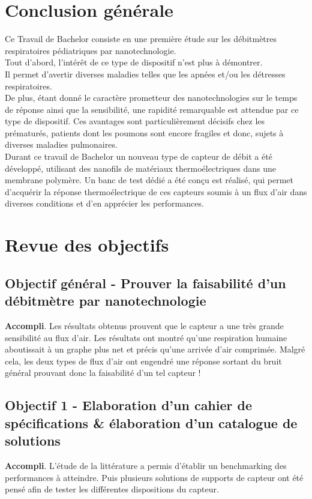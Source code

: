 \section{Conclusion générale}
Ce Travail de Bachelor consiste en une première étude sur les débitmètres respiratoires pédiatriques par nanotechnologie. \\
Tout d'abord, l'intérêt de ce type de dispositif n'est plus à démontrer. \\
Il permet d'avertir diverses maladies telles que les apnées et/ou les détresses respiratoires. \\
De plus, étant donné le caractère prometteur des nanotechnologies sur le temps de réponse ainsi que la sensibilité, une rapidité remarquable 
est attendue par ce type de dispositif. Ces avantages sont particulièrement décisifs chez les prématurés, patients dont les poumons sont encore 
fragiles et donc, sujets à diverses maladies pulmonaires.\\
Durant ce travail de Bachelor un nouveau type de capteur de débit a été développé, utilisant des nanofils de matériaux thermoélectriques dans 
une membrane polymère. Un banc de test dédié a été conçu est réalisé, qui permet d'acquérir la réponse thermoélectrique de ces capteurs soumis 
à un flux d'air dans diverses conditions et d'en apprécier les performances. \\

\section{Revue des objectifs}
\subsection*{Objectif général - Prouver la faisabilité d'un débitmètre par nanotechnologie}
\textbf{Accompli}. Les résultats obtenus prouvent que le capteur a une très grande sensibilité au flux d'air. Les 
résultats ont montré qu'une respiration humaine aboutissait à un graphe plus net et précis qu'une arrivée d'air comprimée. Malgré cela, 
les deux types de flux d'air ont engendré une réponse sortant du bruit général prouvant donc la faisabilité d'un tel capteur !

\subsection*{Objectif 1 - Elaboration d'un cahier de spécifications \& élaboration d'un catalogue de solutions}
\textbf{Accompli}. L'étude de la littérature a permis d'établir un benchmarking des performances à atteindre. Puis plusieurs solutions de supports de capteur 
ont été pensé afin de tester les différentes dispositions du capteur. 

